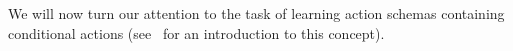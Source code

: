 \documentclass[../Master.tex]{subfiles}
\begin{document}
We will now turn our attention to the task of learning action schemas containing conditional actions (see~ for an introduction to this concept). 
\end{document}
